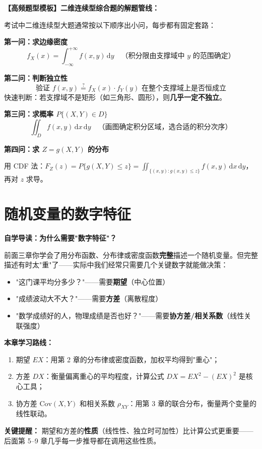 ﻿\documentclass[lang=cn,11pt]{elegantbook}
\begin{document}
\begin{note}
\textbf{【高频题型模板】二维连续型综合题的解题管线：}

考试中二维连续型大题通常按以下顺序出小问，每步都有固定套路：

\textbf{第一问：求边缘密度}
\[
f_X(x)=\int_{-\infty}^{+\infty}f(x,y)\,\mathrm{d}y\quad\text{（积分限由支撑域中 $y$ 的范围确定）}
\]

\textbf{第二问：判断独立性}
\[
\text{验证 } f(x,y)\overset{?}{=}f_X(x)\cdot f_Y(y) \text{ 在整个支撑域上是否恒成立}
\]
快速判断：若支撑域不是矩形（如三角形、圆形），则\textbf{几乎一定不独立}。

\textbf{第三问：求概率 $P\{(X,Y)\in D\}$}
\[
\iint_D f(x,y)\,\mathrm{d}x\,\mathrm{d}y\quad\text{（画图确定积分区域，选合适的积分次序）}
\]

\textbf{第四问：求 $Z=g(X,Y)$ 的分布}

用 CDF 法：$F_Z(z)=P\{g(X,Y)\leq z\}=\displaystyle\iint_{\{(x,y):g(x,y)\leq z\}}f(x,y)\,\mathrm{d}x\,\mathrm{d}y$，再对 $z$ 求导。
\end{note}


\chapter{随机变量的数字特征}

\begin{note}
\textbf{自学导读：为什么需要"数字特征"？}

前面三章你学会了用分布函数、分布律或密度函数\textbf{完整}描述一个随机变量。但完整描述有时太"重"了——实际中我们经常只需要几个关键数字就能做决策：
\begin{itemize}
    \item "这门课平均分多少？"——需要\textbf{期望}（中心位置）
    \item "成绩波动大不大？"——需要\textbf{方差}（离散程度）
    \item "数学成绩好的人，物理成绩是否也好？"——需要\textbf{协方差/相关系数}（线性关联强度）
\end{itemize}

\textbf{本章学习路线：}
\begin{enumerate}
    \item 期望 $EX$：用第 2 章的分布律或密度函数，加权平均得到"重心"；
    \item 方差 $DX$：衡量偏离重心的平均程度，计算公式 $DX=EX^2-(EX)^2$ 是核心工具；
    \item 协方差 $\text{Cov}(X,Y)$ 和相关系数 $\rho_{XY}$：用第 3 章的联合分布，衡量两个变量的线性联动。
\end{enumerate}

\textbf{关键提醒：} 期望和方差的\textbf{性质}（线性性、独立时可加性）比计算公式更重要——后面第 5--9 章几乎每一步推导都在调用这些性质。
\end{note}
\end{document}
